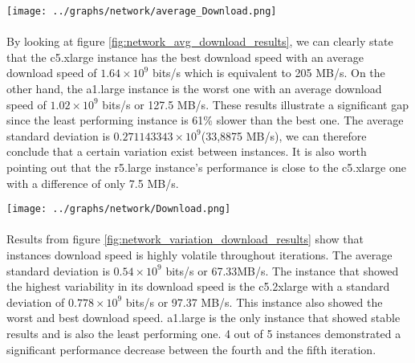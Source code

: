 \documentclass[11pt]{article}
\begin{document}
		\begin{center}
			\begin{minipage}{0.6\textwidth}
				 \label{fig:network_avg_download_results}
				\texttt{[image: ../graphs/network/average\_Download.png]}
			\end{minipage}
		\end{center}

		\paragraph{} By looking at figure \ref{fig:network_avg_download_results}, we can
		clearly state that the c5.xlarge instance has the best download
		speed with an average download speed of \(1.64 \times 10^9\) bits/s which is
		equivalent to 205 MB/s. On the other hand, the a1.large instance is the
		worst one with an average download speed of \(1.02 \times 10^9\) bits/s or 127.5
		MB/s. These results illustrate a significant gap since the least performing
		instance is 61\% slower than the best one. The average standard
		deviation is \(0.271143343 \times 10^9\)(33,8875 MB/s), we can therefore conclude
		that a certain variation exist between instances. It is also worth
		pointing out that the r5.large instance's performance is close to the
		c5.xlarge one with a difference of only 7.5 MB/s.

		\begin{center}
			\begin{minipage}{0.6\textwidth}
				 \label{fig:network_variation_download_results}
				\texttt{[image: ../graphs/network/Download.png]}
			\end{minipage}
		\end{center}

		\paragraph{} Results from figure \ref{fig:network_variation_download_results}
		show that instances download speed is highly volatile throughout
		iterations. The average standard deviation is \(0.54 \times 10^9\)
		bits/s or 67.33MB/s. The instance that showed the highest variability in
		its download speed is the c5.2xlarge with a standard deviation of \(0.778 \times
		10^9\) bits/s or 97.37 MB/s. This instance also showed the worst and
		best download speed. a1.large is the only instance that showed stable
		results and is also the least performing one. 4 out of 5 instances
		demonstrated a significant performance decrease between the fourth and
		the fifth iteration.
\end{document}
